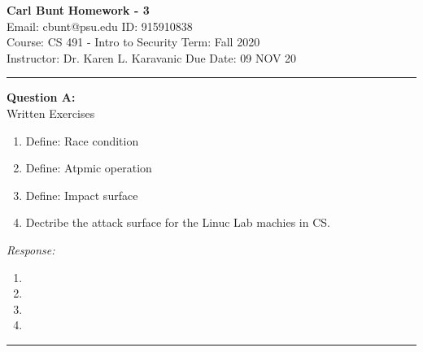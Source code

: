 \documentclass[a4paper, 11pt]{article}
\newenvironment{problem}[2][Question]
               { \begin{mdframed}[backgroundcolor=gray!20] \textbf{#1 #2:} \\}
               {   \end{mdframed}}
\newenvironment{response}
                {\textit{Response:}}
                {}
\begin{document}
 \noindent
 \large\textbf{Carl Bunt} \hfill \textbf{Homework - 3}   \\
 Email: cbunt@psu.edu \hfill ID: 915910838 \\
 \normalsize Course: CS 491 - Intro to Security \hfill Term: Fall 2020\\
 Instructor: Dr. Karen L. Karavanic \hfill Due Date: 09 NOV 20\\
 \noindent\rule{7in}{2.8pt}

 \begin{problem}{A}
   Written Exercises \\
   \begin{enumerate}[label=\arabic*.]
   \item
     Define: Race condition     
   \item
     Define: Atpmic operation
   \item
     Define: Impact surface
   \item
     Dectribe the attack surface for the Linuc Lab machies in CS.
   \end{enumerate}
 \end{problem}

 \begin{response}
   \begin{enumerate}[label=\arabic*.]
   \item
     
   \item

   \item

   \item
     
   \end{enumerate}      
 \end{response}
 \noindent\rule{7in}{2.8pt}
\end{document}
